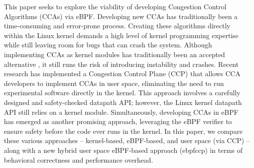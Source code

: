 \documentclass[../main.tex]{subfiles}
\begin{document}
This paper seeks to explore the viability of developing Congestion Control Algorithms (CCAs) via eBPF. Developing new CCAs has traditionally been a time-consuming and error-prone process. Creating these algorithms directly within the Linux kernel demands a high level of kernel programming expertise while still leaving room for bugs that can crash the system. Although implementing CCAs as kernel modules has traditionally been an accepted alternative \cite{Jay2018APK}, it still runs the risk of introducing instability and crashes. Recent research has implemented a Congestion Control Plane (CCP) \cite{ccp} that allows CCA developers to implement CCAs in user space, eliminating the need to run experimental software directly in the kernel. This approach involves a carefully designed and safety-checked datapath API; however, the Linux kernel datapath API still relies on a kernel module. Simultaneously, developing CCAs in eBPF \cite{ebpf_cca} has emerged as another promising approach, leveraging the eBPF verifier to ensure safety before the code ever runs in the kernel. In this paper, we compare these various approaches -- kernel-based, eBPF-based, and user space (via CCP) -- along with a new hybrid user space eBPF-based approach (ebpfccp) in terms of behavioral correctness and performance overhead.
\end{document}
